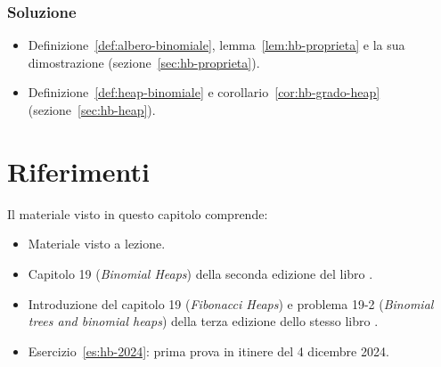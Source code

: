 \subsubsection*{Soluzione}
\begin{itemize}
    \item[(a)] Definizione~\ref{def:albero-binomiale}, lemma~\ref{lem:hb-proprieta} e la sua dimostrazione (sezione~\ref{sec:hb-proprieta}).
    \item[(b)] Definizione~\ref{def:heap-binomiale} e corollario~\ref{cor:hb-grado-heap} (sezione~\ref{sec:hb-heap}).
\end{itemize}

\section*{Riferimenti}
Il materiale visto in questo capitolo comprende:
\begin{itemize}
    \item Materiale visto a lezione.
    \item Capitolo 19 (\emph{Binomial Heaps}) della seconda edizione del libro  \cite{Cormen-et-al-2001}.
    \item Introduzione del capitolo 19 (\emph{Fibonacci Heaps}) e problema 19-2 (\emph{Binomial trees and binomial heaps}) della terza edizione dello stesso libro \cite{Cormen-et-al-2009}.
    \item Esercizio~\ref{es:hb-2024}: prima prova in itinere del 4 dicembre 2024.
\end{itemize}
